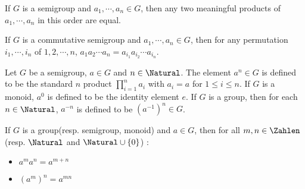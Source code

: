 \begin{Theorem}
	If $ G $ is a semigroup and $ a_1,\cdots,a_n \in G $, then any two meaningful products of $ a_1,\cdots,a_n  $ in this order are equal.
\end{Theorem}
\begin{Theorem}
	If $ G $ is a commutative semigroup and $ a_1,\cdots,a_n \in G $, then for any permutation $ i_1,\cdots,i_n $ of $ 1,2,\cdots,n $, $ a_1 a_2 \cdots a_n = a_{i_1}a_{i_2}\cdots a_{i_n} $.
\end{Theorem}
\begin{Definition}
	Let $ G $ be a semigroup, $ a \in G$ and $ n \in \Natural $. The element $ a^n \in G $ is defined to be the standard $ n $ product $ \prod_{i=1}^{n}a_i $ with $ a_i=a  $ for $ 1 \leqslant i \leqslant n $. If $ G $ is a monoid, $ a^0 $ is defined to be the identity element $ e $. If $ G $ is a group, then for each $ n \in \Natural $, $ a^{-n} $ is defined to be $ (a^{-1})^n \in G $.
\end{Definition}
\begin{Theorem}
	If $ G $ is a group(resp. semigroup, monoid) and $ a \in G $, then for all $ m,n \in \Zahlen $ (resp. $ \Natural $ and $ \Natural \cup \{0\} $) :
	\begin{itemize}
		\item $ a^m a^n = a^{m+n} $ 
		\item $ (a^m)^n=a^{mn} $
	\end{itemize}
\end{Theorem}
